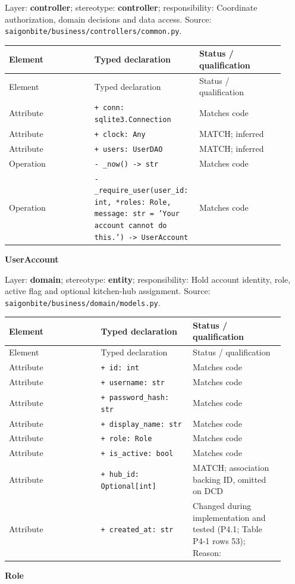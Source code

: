 Layer: \textbf{controller}; stereotype: \textbf{\guillemotleft{}controller\guillemotright{}}; responsibility: Coordinate authorization, domain decisions and data access. Source: \texttt{saigonbite/\allowbreak{}business/\allowbreak{}controllers/\allowbreak{}common.\allowbreak{}py}.

\begin{longtable}{>{\raggedright\arraybackslash}p{0.3067\linewidth}>{\raggedright\arraybackslash}p{0.3067\linewidth}>{\raggedright\arraybackslash}p{0.3067\linewidth}}
Element & Typed declaration & Status / qualification \\
\hline\endfirsthead
Element & Typed declaration & Status / qualification \\
\hline\endhead
Attribute & \texttt{+ conn: sqlite3.\allowbreak{}Connection} & Matches code \\
Attribute & \texttt{+ clock: Any} & MATCH; inferred \\
Attribute & \texttt{+ users: UserDAO} & MATCH; inferred \\
Operation & \texttt{- \_\allowbreak{}now() -\textgreater{} str} & Matches code \\
Operation & \texttt{- \_\allowbreak{}require\_\allowbreak{}user(user\_\allowbreak{}id: int, *roles: Role, message: str = 'Your account cannot do this.\allowbreak{}') -\textgreater{} UserAccount} & Matches code \\
\end{longtable}
\textbf{UserAccount}

Layer: \textbf{domain}; stereotype: \textbf{\guillemotleft{}entity\guillemotright{}}; responsibility: Hold account identity, role, active flag and optional kitchen-hub assignment. Source: \texttt{saigonbite/\allowbreak{}business/\allowbreak{}domain/\allowbreak{}models.\allowbreak{}py}.

\begin{longtable}{>{\raggedright\arraybackslash}p{0.3067\linewidth}>{\raggedright\arraybackslash}p{0.3067\linewidth}>{\raggedright\arraybackslash}p{0.3067\linewidth}}
Element & Typed declaration & Status / qualification \\
\hline\endfirsthead
Element & Typed declaration & Status / qualification \\
\hline\endhead
Attribute & \texttt{+ id: int} & Matches code \\
Attribute & \texttt{+ username: str} & Matches code \\
Attribute & \texttt{+ password\_\allowbreak{}hash: str} & Matches code \\
Attribute & \texttt{+ display\_\allowbreak{}name: str} & Matches code \\
Attribute & \texttt{+ role: Role} & Matches code \\
Attribute & \texttt{+ is\_\allowbreak{}active: bool} & Matches code \\
Attribute & \texttt{+ hub\_\allowbreak{}id: Optional[int]} & MATCH; association backing ID, omitted on DCD \\
Attribute & \texttt{+ created\_\allowbreak{}at: str} & Changed during implementation and tested (P4.1; Table P4-1 rows 53); Reason: \\
\end{longtable}
\textbf{Role}

